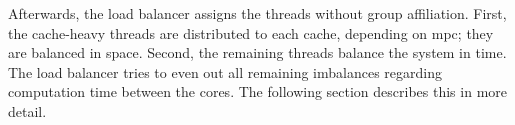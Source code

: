 Afterwards, the load balancer assigns the threads without group affiliation.
First, the cache-heavy threads are distributed to each cache, depending on
\gls{mpc}; they are balanced in space.
Second, the remaining threads balance the system in time.
The load balancer tries to even out all remaining imbalances regarding
computation time between the cores.
The following section describes this in more detail.
